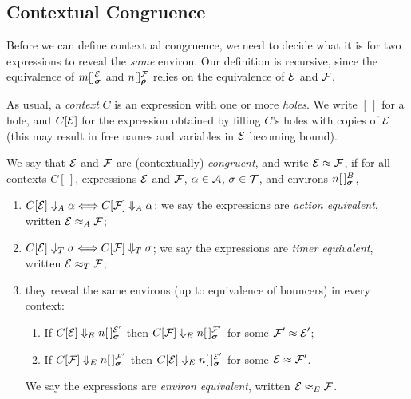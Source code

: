 \documentclass[orivec,envcountsame]{llncs}
\newcommand{\Reveals}[1]{\mathrel{\Downarrow_{#1}}}
\newcommand{\RevealsA}{\Reveals{A}}
\newcommand{\RevealsT}{\Reveals{T}}
\newcommand{\RevealsE}{\Reveals{E}}
\newcommand{\Eq}{\approx}
\newcommand{\EqA}{\mathrel{\Eq_{A}}}
\newcommand{\EqT}{\mathrel{\Eq_{T}}}
\newcommand{\EqE}{\mathrel{\Eq_{E}}}
\begin{document}
\subsection{Contextual Congruence}
\label{sec:contextual-congruence}

Before we can define contextual congruence, we need to decide what it is for 
two expressions to reveal the \emph{same} environ. Our definition is
recursive, since the equivalence of $\locv{m}{}{\expr}{\vec{\sigma}}$ and
$\locv{n}{}{\exprb}{\vec{\rho}}$ relies on the equivalence of $\text{$\mathcal{E}$}$ and
$\text{$\mathcal{F}$}$.

As usual, a \emph{context} $C$ is an expression with one or more
\emph{holes}. We write $[\,]$ for a hole, and $C[\text{$\mathcal{E}$}]$ for the expression
obtained by filling $C$'s holes with copies of $\text{$\mathcal{E}$}$ (this may result
in free names and variables in $\text{$\mathcal{E}$}$ becoming bound).

\begin{definition}

We say that $\text{$\mathcal{E}$}$ and $\text{$\mathcal{F}$}$ are (contextually) \emph{congruent}, and write
$\expr \Eq \exprb$, if for all contexts $C[\,]$, expressions $\text{$\mathcal{E}$}$ and
$\text{$\mathcal{F}$}$, $\alpha \in \text{$\mathcal{A}$}$, $\sigma \in \text{$\mathcal{T}$}$, and environs
$\locv{n}{\,}{B}{\vec{\sigma}}$,

\begin{enumerate}
\item
     $C[\expr] \RevealsA \alpha \Longleftrightarrow C[\exprb] \RevealsA \alpha$;
     we say the expressions are \emph{action equivalent}, written $\expr \EqA
     \exprb$; 
\item
     $C[\expr] \RevealsT \sigma \Longleftrightarrow C[\exprb] \RevealsT \sigma$; we
     say the expressions are \emph{timer equivalent}, written   $\expr \EqT
     \exprb$; 
\item
     they reveal the same environs (up to equivalence of bouncers) in every 
     context:
     \begin{enumerate}
     \item
        If $C[\expr] \RevealsE \locv{n}{\,}{\expr'}{\vec{\sigma}}$ then
        $C[\exprb] \RevealsE \locv{n}{\,}{\exprb'}{\vec{\sigma}}$
        for some $\exprb' \Eq \expr'$;
     \item
        If $C[\exprb] \RevealsE \locv{n}{\,}{\exprb'}{\vec{\sigma}}$ then
        $C[\expr] \RevealsE \locv{n}{\,}{\expr'}{\vec{\sigma}}$
        for some $\expr \Eq \exprb'$.
     \end{enumerate}
     We say the expressions are \emph{environ equivalent}, written $\expr \EqE 
     \exprb$.
\end{enumerate}

\end{definition}
\end{document}
